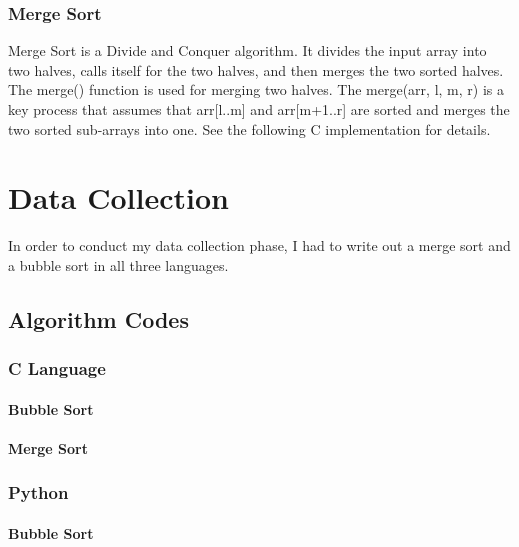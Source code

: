 \documentclass[]{report}
\begin{document}
	    	\subsection{Merge Sort}
	    	Merge Sort is a Divide and Conquer algorithm. It divides the input array into two halves, calls itself for the two halves, and then merges the two sorted halves. The merge() function is used for merging two halves. The merge(arr, l, m, r) is a key process that assumes that arr[l..m] and arr[m+1..r] are sorted and merges the two sorted sub-arrays into one. See the following C implementation for details. \cite{geeksforgeeks_2022}


	 \chapter{Data Collection}
	 	In order to conduct my data collection phase, I had to write out a merge sort and a bubble sort in all three languages.
	 	\section{Algorithm Codes}
			\subsection{C Language}
		 		\subsubsection{Bubble Sort}
		 		
		 		
		 		
		 		\subsubsection{Merge Sort}
		 		
		 		
		 		
		 	\subsection{Python}
		 		\subsubsection{Bubble Sort}
		 		
		 		
		 		
\end{document}
